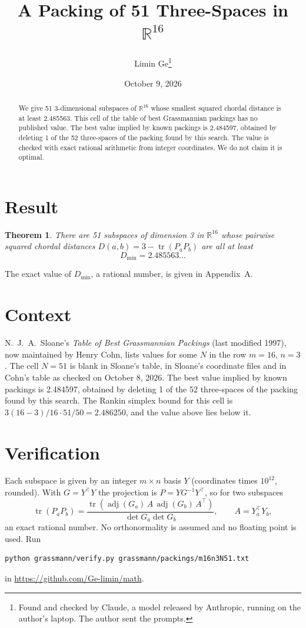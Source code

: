 \documentclass[11pt,a4paper]{article}
\title{A Packing of 51 Three-Spaces in $\mathbb{R}^{16}$}
\author{Limin Ge\thanks{Found and checked by Claude, a model released by Anthropic, running on the author's laptop. The author sent the prompts.}}
\date{October 9, 2026}
\newtheorem*{theorem}{Theorem}
\begin{document}
\maketitle
\begin{abstract}
We give 51 3-dimensional subspaces of $\mathbb{R}^{16}$ whose smallest squared chordal distance is at least 2.485563. This cell of the table of best Grassmannian packings has no published value. The best value implied by known packings is 2.484597, obtained by deleting 1 of the 52 three-spaces of the packing found by this search. The value is checked with exact rational arithmetic from integer coordinates. We do not claim it is optimal.
\end{abstract}

\section{Result}
\begin{theorem}
There are 51 subspaces of dimension 3 in $\mathbb{R}^{16}$ whose pairwise squared chordal distances $D(a,b) = 3 - \operatorname{tr}(P_aP_b)$ are all at least
\[ D_{\min} = 2.485563\ldots \]
\end{theorem}
The exact value of $D_{\min}$, a rational number, is given in Appendix~A.


\section{Context}
N.~J.~A.~Sloane's \emph{Table of Best Grassmannian Packings} (last modified 1997), now maintained by Henry Cohn, lists values for some $N$ in the row $m=16$, $n=3$. The cell $N=51$ is blank in Sloane's table, in Sloane's coordinate files and in Cohn's table as checked on October 8, 2026. The best value implied by known packings is 2.484597, obtained by deleting 1 of the 52 three-spaces of the packing found by this search. The Rankin simplex bound for this cell is $3(16-3)/16\cdot 51/50 = 2.486250$, and the value above lies below it.


\section{Verification}
Each subspace is given by an integer $m\times n$ basis $Y$ (coordinates times $10^{12}$, rounded). With $G=Y^\top Y$ the projection is $P=YG^{-1}Y^\top$, so for two subspaces
\[ \operatorname{tr}(P_aP_b)=\frac{\operatorname{tr}(\operatorname{adj}(G_a)\,A\,\operatorname{adj}(G_b)\,A^\top)}{\det G_a\det G_b},\qquad A=Y_a^\top Y_b, \]
an exact rational number. No orthonormality is assumed and no floating point is used. Run
\begin{verbatim}
python grassmann/verify.py grassmann/packings/m16n3N51.txt
\end{verbatim}
in \url{https://github.com/Ge-limin/math}.
\end{document}
